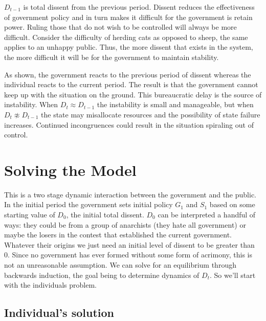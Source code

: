 \documentclass[12pt]{article}
\begin{document}
\begin{spacing}{1.5}
$D_{t-1}$ is total dissent from the previous period. Dissent reduces the effectiveness of government policy and in turn makes it difficult for the government is retain power. Ruling those that do not wish to be controlled will always be more difficult. Consider the difficulty of herding cats as opposed to sheep, the same applies to an unhappy public. Thus, the more dissent that exists in the system, the more difficult it will be for the government to maintain stability.  

As shown, the government reacts to the previous period of dissent whereas the individual reacts to the current period. The result is that the government cannot keep up with the situation on the ground. This bureaucratic delay is the source of instability. When $D_t \approx D_{t-1}$ the instability is small and manageable, but when $D_t \not\approx D_{t-1}$ the state may misallocate resources and the possibility of state failure increases. Continued incongruences could result in the situation spiraling out of control. 

\section{Solving the Model}

This is a two stage dynamic interaction between the government and the public. In the initial period the government sets initial policy $G_1$ and $S_1$ based on some starting value of $D_0$, the initial total dissent. $D_0$ can be interpreted a handful of ways: they could be from a group of anarchists (they hate all government) or maybe the losers in the contest that established the current government. Whatever their origins we just need an initial level of dissent to be greater than 0. Since no government has ever formed without some form of acrimony, this is not an unreasonable assumption. We can solve for an equilibrium through backwards induction, the goal being to determine dynamics of $D_t$. So we'll start with the individuals problem. 

\subsection{Individual's solution}



\end{spacing}
\end{document}
